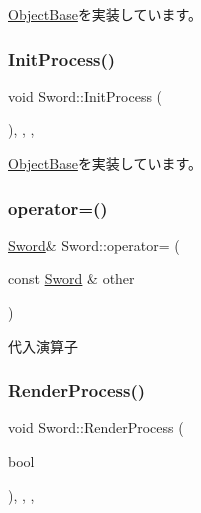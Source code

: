 \mbox{\hyperlink{class_object_base_a7fa4c548153c3af20f89673ffea809af}{Object\+Base}}を実装しています。

\mbox{\label{class_sword_aab0c07888f3aaee1ba25d668ac7c847a}} 
\subsubsection{\texorpdfstring{Init\+Process()}{InitProcess()}}
{\footnotesize\ttfamily void Sword\+::\+Init\+Process (\begin{DoxyParamCaption}{ }\end{DoxyParamCaption})\hspace{0.3cm}{\ttfamily [inline]}, {\ttfamily [final]}, {\ttfamily [protected]}, {\ttfamily [virtual]}}



\mbox{\hyperlink{class_object_base_af133f36f2bca1dcfd962e2cfac61ab51}{Object\+Base}}を実装しています。

\mbox{\label{class_sword_a47720cf8f0a44a9a30cf586a188a4730}} 
\subsubsection{\texorpdfstring{operator=()}{operator=()}}
{\footnotesize\ttfamily \mbox{\hyperlink{class_sword}{Sword}}\& Sword\+::operator= (\begin{DoxyParamCaption}\item[{const \mbox{\hyperlink{class_sword}{Sword}} \&}]{other }\end{DoxyParamCaption})\hspace{0.3cm}{\ttfamily [inline]}}



代入演算子 

\mbox{\label{class_sword_a7f5d2c6e6e0104e9a85f600eec14ef6d}} 
\subsubsection{\texorpdfstring{Render\+Process()}{RenderProcess()}}
{\footnotesize\ttfamily void Sword\+::\+Render\+Process (\begin{DoxyParamCaption}\item[{bool}]{ }\end{DoxyParamCaption})\hspace{0.3cm}{\ttfamily [inline]}, {\ttfamily [final]}, {\ttfamily [protected]}, {\ttfamily [virtual]}}



